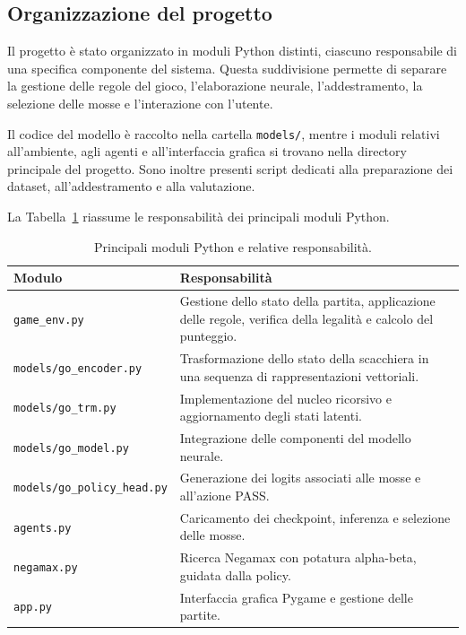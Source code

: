 \subsection{Organizzazione del progetto}

Il progetto è stato organizzato in moduli Python distinti, ciascuno responsabile di una specifica componente del sistema. Questa suddivisione permette di separare la gestione delle regole del gioco, l'elaborazione neurale, l'addestramento, la selezione delle mosse e l'interazione con l'utente.

Il codice del modello è raccolto nella cartella \texttt{models/}, mentre i moduli relativi all'ambiente, agli agenti e all'interfaccia grafica si trovano nella directory principale del progetto. Sono inoltre presenti script dedicati alla preparazione dei dataset, all'addestramento e alla valutazione.

La Tabella~\ref{tab:project_modules} riassume le responsabilità dei principali moduli Python.

\begin{table}[H]
    \centering
    \small
    \begin{tabular}{p{5.0cm}|p{8cm}}
        \textbf{Modulo}                     & \textbf{Responsabilità}                                                   \\
        \hline
        \texttt{game\_env.py}               &
        Gestione dello stato della partita, applicazione delle regole, verifica della legalità e calcolo del punteggio. \\
        \texttt{models/go\_encoder.py}      &
        Trasformazione dello stato della scacchiera in una sequenza di rappresentazioni vettoriali.                     \\
        \texttt{models/go\_trm.py}          &
        Implementazione del nucleo ricorsivo e aggiornamento degli stati latenti.                                       \\
        \texttt{models/go\_model.py}        &
        Integrazione delle componenti del modello neurale.                                                              \\
        \texttt{models/go\_policy\_head.py} &
        Generazione dei logits associati alle mosse e all'azione PASS.                                                  \\
        \texttt{agents.py}                  &
        Caricamento dei checkpoint, inferenza e selezione delle mosse.                                                  \\
        \texttt{negamax.py}                 &
        Ricerca Negamax con potatura alpha-beta, guidata dalla policy.                                                  \\
        \texttt{app.py}                     &
        Interfaccia grafica Pygame e gestione delle partite.                                                            \\
    \end{tabular}
    \caption{Principali moduli Python e relative responsabilità.}
    \label{tab:project_modules}
\end{table}

